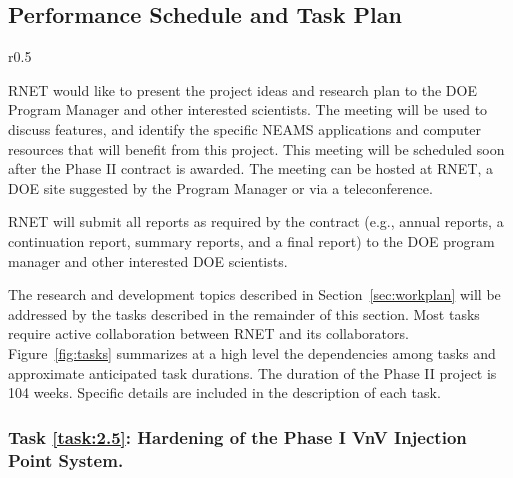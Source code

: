 \subsection{Performance Schedule and Task Plan}
\label{sec:taskplan}

\begin{wrapfigure}{r}{0.5\linewidth}%
\begin{center}
\leavevmode
\end{center}
\caption{Overview of task dependencies and timeline.}
\label{fig:tasks}
\end{wrapfigure}

RNET would like to present the project ideas and research plan to the
DOE Program Manager and other interested scientists. The meeting will
be used to discuss features, and identify the specific NEAMS applications and computer
resources that will benefit from this project.  This meeting will be
scheduled soon after the Phase II contract is awarded. The meeting can
be hosted at RNET, a DOE site suggested by the Program Manager or via
a teleconference.

RNET will submit all reports as required by the contract (e.g., annual reports, 
a continuation report, summary reports, and a final report) to the DOE program 
manager and other interested DOE scientists.

The research and development topics described in Section~\ref{sec:workplan} 
will be addressed by the tasks described in the remainder of this section. Most 
tasks require active collaboration between RNET and its collaborators. 
Figure~\ref{fig:tasks} summarizes at a high level the dependencies among tasks  and
approximate anticipated task durations. The duration of the Phase II 
project is 104 weeks. Specific details are included in the description of each 
task.


\setcounter{taskCount}{0}

\label{task:2.5}
\subsubsection{Task \ref{task:2.5}: Hardening of the Phase I VnV Injection Point System. }

